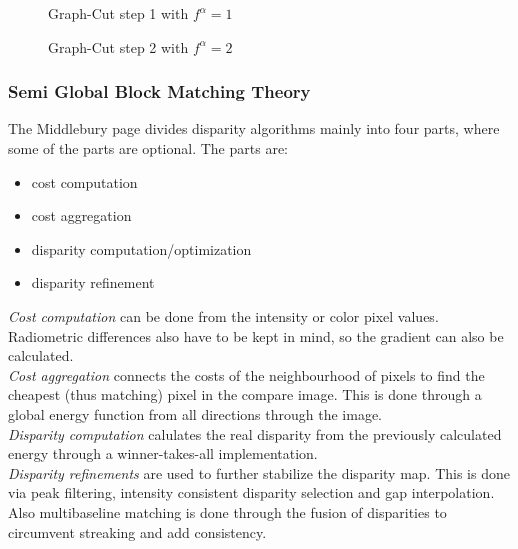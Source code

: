 \documentclass[a4paper]{article}
\begin{document}
\begin{figure}[t]
\centering

\end{figure}

\begin{figure}[t]
\centering


\caption{Graph-Cut step 1 with $f^\alpha = 1$}


\caption{Graph-Cut step 2 with $f^\alpha = 2$}
\end{figure}

\subsubsection{Semi Global Block Matching Theory}
\label{bm_theory}
The Middlebury page divides disparity algorithms mainly into four
parts, where some of the parts are optional. The parts are:
\begin{itemize}
\item cost computation
\item cost aggregation
\item disparity computation/optimization
\item disparity refinement
\end{itemize}
\noindent\textit{Cost computation} can be done from the intensity or color
pixel values. Radiometric differences also have to be kept in mind, so
the gradient can also be calculated.\\
\textit{Cost aggregation} connects the costs of the neighbourhood of
pixels to find the cheapest (thus matching) pixel in the compare
image. This is done through a global energy function from all
directions through the image.\\
\textit{Disparity computation} calulates the real disparity from the
previously calculated energy through a winner-takes-all
implementation.\\
\textit{Disparity refinements} are used to further stabilize the
disparity map. This is done via peak filtering, intensity consistent
disparity selection and gap interpolation. Also multibaseline matching
is done through the fusion of disparities to circumvent streaking and
add consistency.\\
\end{document}
